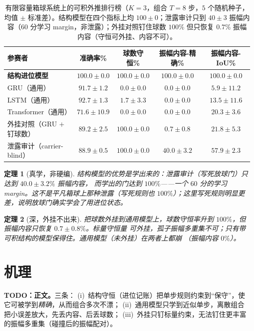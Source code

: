 \documentclass[11pt]{article}
\newtheorem{Theorem}{定理}[section]
\begin{document}
\begin{table}[h]
\centering
\caption{有限容量箱球系统上的可积外推排行榜（$K=3$，组合 $T=8$ 步，$5$ 个随机种子，均值 $\pm$
标准差）。结构模型在四个指标上均 $100\pm0$；泄露审计只到 $40\pm3$ 振幅内容（$60$ 分学习
margin，非泄露）；外挂对照钉住球数 $100\%$ 但只恢复 $0.7\%$ 振幅内容（守恒可外挂、内容不可）。}
\label{tab:tier1}
\begin{tabular}{lcccc}
\toprule
\textbf{参赛者} & \textbf{准确率\%} & \textbf{球数守恒\%} & \textbf{振幅内容-精确\%} & \textbf{振幅内容-IoU\%} \\
\midrule
\textbf{结构进位模型} & $\mathbf{100.0\pm0.0}$ & $\mathbf{100.0\pm0.0}$ & $\mathbf{100.0\pm0.0}$ & $\mathbf{100.0\pm0.0}$ \\
GRU（通用） & $91.7\pm1.2$ & $0.0\pm0.0$ & $0.0\pm0.0$ & $5.9\pm11.2$ \\
LSTM（通用） & $92.7\pm1.3$ & $1.7\pm3.3$ & $0.0\pm0.0$ & $13.5\pm11.6$ \\
Transformer（通用） & $71.6\pm10.9$ & $0.0\pm0.0$ & $0.0\pm0.0$ & $20.3\pm3.6$ \\
外挂对照（GRU $+$ 钉球数） & $89.2\pm2.5$ & $100.0\pm0.0$ & $0.7\pm0.8$ & $21.8\pm5.3$ \\
泄露审计（carrier-blind） & $88.9\pm0.5$ & $100.0\pm0.0$ & $40.0\pm3.2$ & $57.9\pm2.3$ \\
\bottomrule
\end{tabular}
\end{table}

\begin{Theorem}[真学，非硬编]\label{thm:genuine}
结构模型的优势是\emph{学出来的}：泄露审计（写死放球门）只达到 $40.0\pm3.2\%$ 振幅内容，
而学出的门达到 $100\%$——一个 $60$ 分的学习 margin。这不是平凡箱球上那种泄露（写死规则也
$100\%$）；这里写死规则明显更差，说明放球门确实学会了用进位状态。
\end{Theorem}

\begin{Theorem}[深，外挂不出来]\label{thm:depth}
把球数外挂到通用模型上，球数守恒率升到 $100\%$，但振幅内容只恢复 $0.7\pm0.8\%$。标量守恒量
可外挂，孤子振幅多重集不可；只有带可积结构的模型保得住。通用模型（未外挂）在两者上都崩
（振幅内容 $0\%$）。
\end{Theorem}

\section{机理}\label{sec:mechanism}
\textbf{TODO：正文。}三条：
(i)~结构守恒（进位记账）把单步规则约束到“保守”，使它可被学到\emph{精确}，从而组合多次不漂；
(ii)~通用模型只学到近似单步，离散组合把小误差放大，先丢内容、后丢球数；
(iii)~外挂只钉标量约束，无法钉住更丰富的振幅多重集（碰撞后的振幅配对）。
\end{document}
